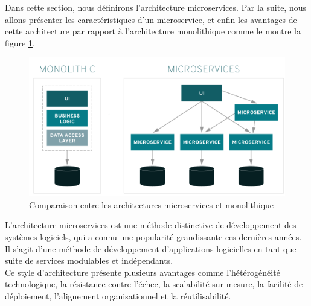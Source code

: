 \color{black}
Dans cette section, nous définirons l'architecture microservices. Par la suite, nous allons présenter les caractéristiques d'un microservice, et enfin les avantages de cette architecture par rapport à l'architecture monolithique comme le montre la figure \ref{fig:architecture micro vs architecture mono}. \\
\begin{figure}[H]
    \centering
    \includegraphics[scale=0.6]{img/monolithic-vs-microservices.png}
    \caption{Comparaison entre les architectures microservices et monolithique}
    \label{fig:architecture micro vs architecture mono}
\end{figure}

L'architecture microservices est une méthode distinctive de développement des systèmes logiciels, qui a connu une popularité grandissante ces dernières années. Il s'agit d'une méthode de développement d'applications logicielles en tant que suite de services modulables et indépendants.\\
Ce style d’architecture présente plusieurs avantages comme l’hétérogénéité technologique, la résistance contre l’échec, la scalabilité sur mesure, la facilité de déploiement, l’alignement organisationnel et la réutilisabilité.
